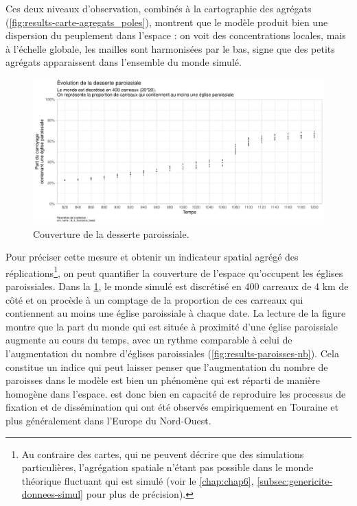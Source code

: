 Ces deux niveaux d'observation, combinés à la cartographie des agrégats (\cref{fig:results-carte-agregats_poles}), montrent que le modèle produit bien une dispersion du peuplement dans l'espace : on voit des concentrations locales, mais à l'échelle globale, les mailles sont harmonisées par le bas, signe que des petits agrégats apparaissent dans l'ensemble du monde simulé.

\begin{figure}[H]
	\centering
	\includegraphics[width=\linewidth]{img/results_6_6/Paroisses_Desserte_Haut.pdf}
	\caption{Couverture de la desserte paroissiale.}
	\label{fig:results-paroisses-desserte}
\end{figure}

Pour préciser cette mesure et obtenir un indicateur spatial agrégé des réplications\footnote{
	Au contraire des cartes, qui ne peuvent décrire que des simulations particulières, l'agrégation spatiale n'étant pas possible dans le monde théorique fluctuant qui est simulé (voir le \cref{chap:chap6}, \cref{subsec:genericite-donnees-simul} pour plus de précision).
}, on peut quantifier la couverture de l'espace qu'occupent les églises paroissiales.
Dans la \cref{fig:results-paroisses-desserte}, le monde simulé est discrétisé en 400 carreaux de 4 km de côté et on procède à un comptage de la proportion de ces carreaux qui contiennent au moins une église paroissiale à chaque date.
La lecture de la figure montre que la part du monde qui est située à proximité d'une église paroissiale augmente au cours du temps, avec un rythme comparable à celui de l'augmentation du nombre d'églises paroissiales (\cref{fig:results-paroisses-nb}).
Cela constitue un indice qui peut laisser penser que l'augmentation du nombre de paroisses dans le modèle est bien un phénomène qui est réparti de manière homogène dans l'espace.
\simfeodal{} est donc bien en capacité de reproduire les processus de fixation et de dissémination qui ont été observés empiriquement en Touraine et plus généralement dans l'Europe du Nord-Ouest.



